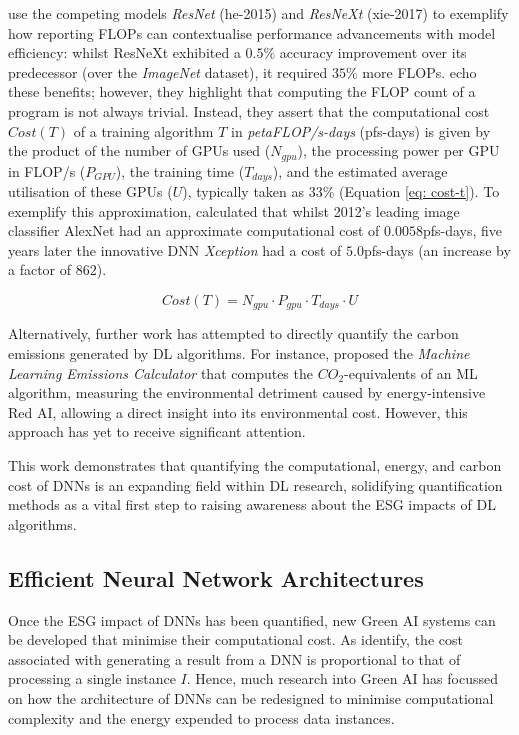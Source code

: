 \documentclass[a4paper, 11pt]{report}
\begin{document}
    \citet{schwartz-2019} use the competing models \emph{ResNet} (he-2015) and \emph{ResNeXt} (xie-2017) to exemplify how reporting FLOPs can contextualise performance advancements with model efficiency: whilst ResNeXt exhibited a $0.5\%$ accuracy improvement over its predecessor (over the \emph{ImageNet} dataset), it required $35\%$ more FLOPs. \citet{amodei-2018} echo these benefits; however, they highlight that computing the FLOP count of a program is not always trivial. Instead, they assert that the computational cost $Cost(T)$ of a training algorithm $T$ in \emph{petaFLOP/s-days} (pfs-days) is given by the product of the number of GPUs used ($N_{gpu}$), the processing power per GPU in FLOP/s ($P_{GPU}$), the training time ($T_{days}$), and the estimated average utilisation of these GPUs ($U$), typically taken as $33\%$ (Equation \ref{eq: cost-t}). To exemplify this approximation, \citeauthor{amodei-2018} calculated that whilst 2012's leading image classifier AlexNet \citep{krizhevsky-2012} had an approximate computational cost of $0.0058$pfs-days, five years later the innovative DNN \emph{Xception} \citep{chollet-2017} had a cost of $5.0$pfs-days (an increase by a factor of $862$).

    \begin{equation}
        \label{eq: cost-t}
        Cost(T) = N_{gpu} \cdot P_{gpu} \cdot T_{days} \cdot U
    \end{equation}

    Alternatively, further work has attempted to directly quantify the carbon emissions generated by DL algorithms. For instance, \citet{lacoste-2019} proposed the \emph{Machine Learning Emissions Calculator} that computes the $CO_2$-equivalents of an ML algorithm, measuring the environmental detriment caused by energy-intensive Red AI, allowing a direct insight into its environmental cost. However, this approach has yet to receive significant attention.

    This work demonstrates that quantifying the computational, energy, and carbon cost of DNNs is an expanding field within DL research, solidifying quantification methods as a vital first step to raising awareness about the ESG impacts of DL algorithms.


    \subsection{Efficient Neural Network Architectures}

    Once the ESG impact of DNNs has been quantified, new Green AI systems can be developed that minimise their computational cost. As \citet{schwartz-2019} identify, the cost associated with generating a result from a DNN is proportional to that of processing a single instance $I$. Hence, much research into Green AI has focussed on how the architecture of DNNs can be redesigned to minimise computational complexity and the energy expended to process data instances. 
\end{document}

